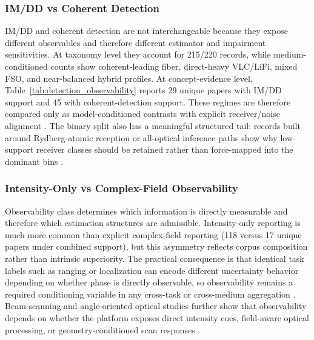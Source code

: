 \documentclass[letterpaper,journal]{IEEEtran}
\begin{document}
\subsubsection{IM/DD vs Coherent Detection}
IM/DD and coherent detection are not interchangeable because they expose different observables and therefore different estimator and impairment sensitivities. At taxonomy level they account for 215/220 records, while medium-conditioned counts show coherent-leading fiber, direct-heavy VLC/LiFi, mixed FSO, and near-balanced hybrid profiles. At concept-evidence level, Table~\ref{tab:detection_observability} reports 29 unique papers with IM/DD support and 45 with coherent-detection support. These regimes are therefore compared only as model-conditioned contrasts with explicit receiver/noise alignment \cite{O_ISAC_001,O_ISAC_023,O_ISAC_028,O_ISAC_029,O_ISAC_190}. The binary split also has a meaningful structured tail: records built around Rydberg-atomic reception or all-optical inference paths show why low-support receiver classes should be retained rather than force-mapped into the dominant bins \cite{O_ISAC_122,O_ISAC_136}.

\subsubsection{Intensity-Only vs Complex-Field Observability}
Observability class determines which information is directly measurable and therefore which estimation structures are admissible. Intensity-only reporting is much more common than explicit complex-field reporting (118 versus 17 unique papers under combined support), but this asymmetry reflects corpus composition rather than intrinsic superiority. The practical consequence is that identical task labels such as ranging or localization can encode different uncertainty behavior depending on whether phase is directly observable, so observability remains a required conditioning variable in any cross-task or cross-medium aggregation \cite{O_ISAC_021,O_ISAC_082,O_ISAC_039,O_ISAC_056}. Beam-scanning and angle-oriented optical studies further show that observability depends on whether the platform exposes direct intensity cues, field-aware optical processing, or geometry-conditioned scan responses \cite{O_ISAC_122,O_ISAC_124}.
\end{document}
